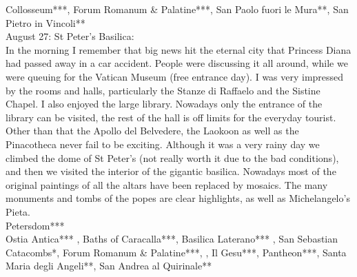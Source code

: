 Collosseum***, Forum Romanum \& Palatine***, San Paolo fuori le Mura**, San Pietro in Vincoli**\\


August 27: St Peter's Basilica:\\
In the morning I remember that big news hit the eternal city that Princess Diana had passed away in a car accident. People were discussing it all around, while we were queuing for the Vatican Museum (free entrance day). I was very impressed by the rooms and halls, particularly the Stanze di Raffaelo and the Sistine Chapel. I also enjoyed the large library. Nowadays only the entrance of the library can be visited, the rest of the hall is off limits for the everyday tourist. Other than that the Apollo del Belvedere, the Laokoon as well as the Pinacotheca never fail to be exciting. Although it was a very rainy day we climbed the dome of St Peter's (not really worth it due to the bad conditions), and then we visited the interior of the gigantic basilica. Nowadays most of the original paintings of all the altars have been replaced by mosaics. The many monuments and tombs of the popes are clear highlights, as well as Michelangelo's Pieta.\\  

Petersdom***\\





Ostia Antica*** , Baths of Caracalla***, Basilica Laterano*** , San Sebastian Catacombs*, Forum Romanum \& Palatine***, , Il Gesu***, Pantheon***, Santa Maria degli Angeli**, San Andrea al Quirinale**